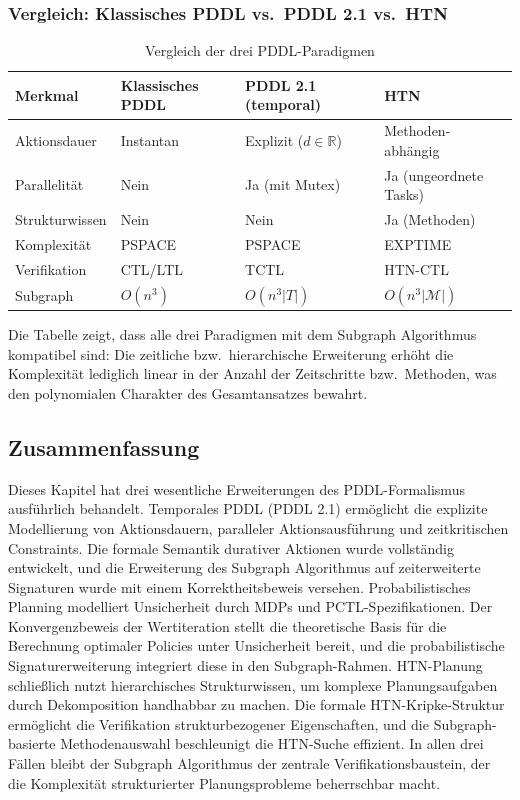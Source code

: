 ﻿\documentclass[a4paper,12pt]{article}
\theoremstyle{definition}
\begin{document}
\subsubsection{Vergleich: Klassisches PDDL vs.\ PDDL 2.1 vs.\ HTN}

\begin{table}[h]
  \centering
  \caption{Vergleich der drei PDDL-Paradigmen}
  \label{tab:pddl_paradigmen}
  \begin{tabular}{p{2.4cm}p{2.8cm}p{3.0cm}p{2.8cm}}
    \toprule
    Merkmal & Klassisches PDDL & PDDL 2.1 (temporal) & HTN \\
    \midrule
    Aktionsdauer & Instantan & Explizit ($d \in \mathbb{R}$) & Methoden-abhängig \\
    Parallelität & Nein & Ja (mit Mutex) & Ja (ungeordnete Tasks) \\
    Struktur\-wissen & Nein & Nein & Ja (Methoden) \\
    Komplexität & PSPACE & PSPACE & EXPTIME \\
    Verifikation & CTL/LTL & TCTL & HTN-CTL \\
    Subgraph & $O(n^3)$ & $O(n^3 |T|)$ & $O(n^3 |\mathcal{M}|)$ \\
    \bottomrule
  \end{tabular}
\end{table}

Die Tabelle zeigt, dass alle drei Paradigmen mit dem Subgraph Algorithmus kompatibel sind: Die zeitliche bzw.\ hierarchische Erweiterung erhöht die Komplexität lediglich linear in der Anzahl der Zeitschritte bzw.\ Methoden, was den polynomialen Charakter des Gesamtansatzes bewahrt.

\subsection{Zusammenfassung}

Dieses Kapitel hat drei wesentliche Erweiterungen des PDDL-Formalismus ausführlich behandelt. Temporales PDDL (PDDL 2.1) ermöglicht die explizite Modellierung von Aktionsdauern, paralleler Aktionsausführung und zeitkritischen Constraints. Die formale Semantik durativer Aktionen wurde vollständig entwickelt, und die Erweiterung des Subgraph Algorithmus auf zeiterweiterte Signaturen wurde mit einem Korrektheitsbeweis versehen. Probabilistisches Planning modelliert Unsicherheit durch MDPs und PCTL-Spezifikationen. Der Konvergenzbeweis der Wertiteration stellt die theoretische Basis für die Berechnung optimaler Policies unter Unsicherheit bereit, und die probabilistische Signaturerweiterung integriert diese in den Subgraph-Rahmen. HTN-Planung schließlich nutzt hierarchisches Strukturwissen, um komplexe Planungsaufgaben durch Dekomposition handhabbar zu machen. Die formale HTN-Kripke-Struktur ermöglicht die Verifikation strukturbezogener Eigenschaften, und die Subgraph-basierte Methodenauswahl beschleunigt die HTN-Suche effizient. In allen drei Fällen bleibt der Subgraph Algorithmus der zentrale Verifikationsbaustein, der die Komplexität strukturierter Planungsprobleme beherrschbar macht.
\end{document}

